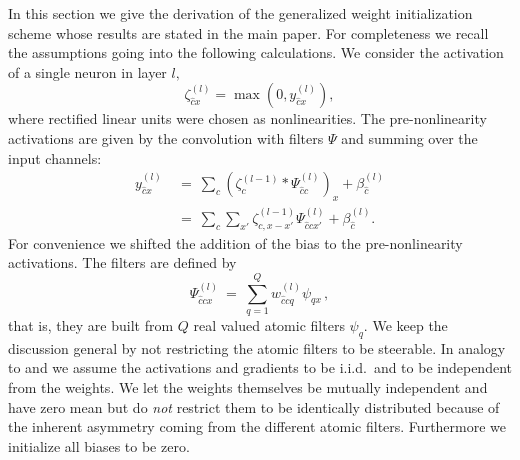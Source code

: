 \documentclass[10pt,twocolumn,letterpaper]{article}
\begin{document}
In this section we give the derivation of the generalized weight initialization scheme whose results are stated in the main paper.
For completeness we recall the assumptions going into the following calculations.
We consider the activation of a single neuron in layer $l,$
\begin{equation}\label{eq:Activation}
	\zeta_{\hat{c}x}^{(l)}=\max(0,y_{\hat{c}x}^{(l)}),
\end{equation}
where rectified linear units were chosen as nonlinearities.
The pre-nonlinearity activations are given by the convolution with filters $\Psi$ and summing over the input channels:
\begin{equation}\label{eq:preNonlinearityActivation}
\begin{split}
	y_{\hat{c}x}^{(l)}\
	&=\ \sum_{c}\left(\zeta_{c}^{(l-1)} \ast \Psi_{\hat{c}c}^{(l)}\right)_x + \beta_{\hat{c}}^{(l)} \\
	&=\ \sum_{c}\sum_{x'} \zeta_{c,x-x'}^{(l-1)} \Psi_{\hat{c}cx'}^{(l)} + \beta_{\hat{c}}^{(l)}.
\end{split}
\end{equation}
For convenience we shifted the addition of the bias to the pre-nonlinearity activations.
The filters are defined by
\[
	\Psi_{\hat{c}cx}^{(l)}\ =\ \sum_{q=1}^Q w_{\hat{c}cq}^{(l)}\psi_{qx} \,,
\]
that is, they are built from $Q$ real valued atomic filters $\psi_{q}$.
We keep the discussion general by not restricting the atomic filters to be steerable.
In analogy to \citet{Glorot10understandingthe} and \citet{DBLP:journals/corr/HeZR015} we assume the activations and gradients to be i.i.d.~and to be independent from the weights. We let the weights themselves be mutually independent and have zero mean but do \emph{not} restrict them to be identically distributed because of the inherent asymmetry coming from the different atomic filters. Furthermore we initialize all biases to be zero.
\end{document}

